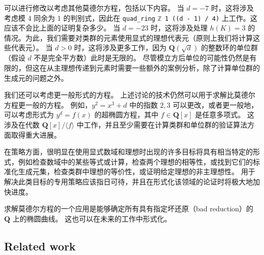 \documentclass[sigplan,10pt,nonacm,
screen]{acmart} \settopmatter{printfolios=true,printccs=false,printacmref=false}
\newcommand{\ab}[1]{\todo[color=green]{AB: #1}}
\newcommand{\QQ}{\mathbf{Q}}
\newcommand{\ZZ}{\mathbf{Z}}
\begin{document}
可以进行修改以考虑其他莫德尔方程，包括以下内容。
%
%
当 $d = -7$ 时，这将涉及考虑模 4 同余为 1 的判别式，因此在 \lstinline{quad_ring} %
\lstinline{ℤ 1 ((d - 1) / 4)} 上工作。这应该不会比上面的证明复杂多少。 %
%
当 $d=-23$ 时，这将涉及处理 $h(K)=3$ 的情况。为此，我们需要对类群的元素使用显式的理想代表元（原则上我们将计算这些代表元）。
%
%
当 $d > 0$ 时，这将涉及更多工作，因为 $\QQ(\sqrt{d})$ 的整数环的单位群（假设 $d$ 不是完全平方数）此时是无限的。 %
尽管模立方后单位的可能性仍然是有限的，但这在从主理想传递到元素时需要一些额外的案例分析，除了计算单位群的生成元的问题之外。

我们还可以考虑更一般形式的方程。
上述讨论的技术仍然可以用于求解比莫德尔方程更一般的方程。
例如，$y^2 = x^3 +d$ 中的指数 $2,3$ 可以更改，或者更一般地，可以考虑形式为 $y^d = f(x)$ 的超椭圆方程，其中 $f \in \QQ[x]$ 是任意多项式。
这涉及在代数 $\QQ[x]/\langle f\rangle$ 中工作，并且至少需要在计算类群和单位群的验证算法方面取得重大进展。

在策略方面，很明显在使用显式数域和理想时出现的许多目标将具有相当特定的形式，例如检查数域中的某些等式或计算，检查两个理想的相等性，或找到它们的标准化生成元集，检查类群中理想的等价性，或证明给定理想的非主理想性。
用于解决此类目标的专用策略应该指日可待，并且在形式化该领域的论证时将极大地加快进度。

求解莫德尔方程的一个应用是能够确定所有具有指定坏还原（bad reduction）的 $\QQ$ 上的椭圆曲线。
这也可以在未来的工作中形式化。

\subsection{Related work}\label{sec:Related}
\end{document}
